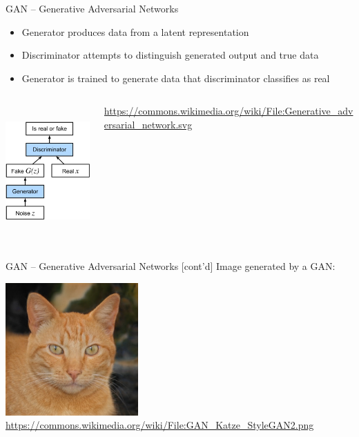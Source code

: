 \documentclass[ignorenonframetext,xcolor=x11names]{beamer}
\begin{document}
\begin{frame}{GAN -- Generative Adversarial Networks}

\begin{itemize}

\item Generator produces data from a latent representation
\item Discriminator attempts to distinguish generated output and true data
\item Generator is trained to generate data that discriminator classifies as real
\end{itemize}

\begin{columns}
\begin{column}{.6\textwidth}
\begin{center}
\includegraphics[height=2in]{Generative_adversarial_network.svg.png}\\
\end{center}
\end{column}
\begin{column}{.3\textwidth}
\scriptsize \url{https://commons.wikimedia.org/wiki/File:Generative_adversarial_network.svg} \normalsize
\end{column}
\end{columns}

\end{frame}

\begin{frame}{GAN -- Generative Adversarial Networks \small [cont'd]}
Image generated by a GAN:

\begin{center}
\includegraphics[height=2in]{GAN_Katze_StyleGAN2.png} \\

\scriptsize \url{https://commons.wikimedia.org/wiki/File:GAN_Katze_StyleGAN2.png} \normalsize
\end{center}

\end{frame}
\end{document}
